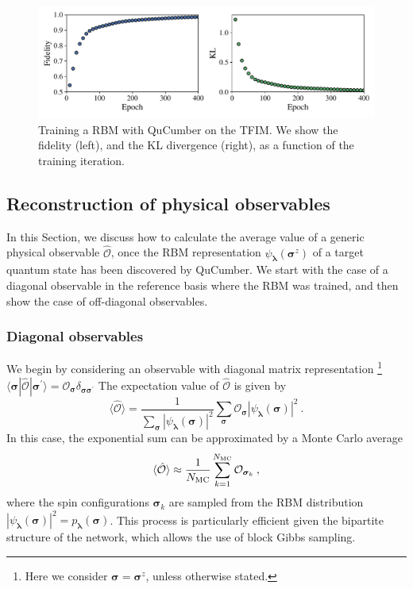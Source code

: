 \documentclass[submission, Phys, hidelinks]{SciPost}
\begin{document}
\begin{figure}[hbt]
    \centering{}
    \includegraphics[width=\textwidth]{plots/fid_KL.pdf}
    \caption{\label{fig:KL} Training a RBM with QuCumber on the TFIM. We show the fidelity (left), and the KL divergence (right), as a function of the training iteration.}
\end{figure}

\subsection{Reconstruction of physical observables} \label{Sec:Sampling_a-Trained_RBM}
In this Section, we discuss how to calculate the average value of a generic physical observable $\hat{\mathcal{O}}$, once the RBM representation $\psi_{\bm{\lambda}}(\bm{\sigma}^z)$ of a target quantum state has been discovered by QuCumber. We start with the case of a diagonal observable in the reference basis where the RBM was trained, and then show the case of off-diagonal observables.

\subsubsection{Diagonal observables}
We begin by considering an observable with diagonal matrix representation
\footnote{
Here we consider $\bm{\sigma}=\bm{\sigma}^z$, unless otherwise stated.
} 
$\langle\bm{\sigma}|\hat{\mathcal{O}}|\bm{\sigma}^{\prime}\rangle=\mathcal{O}_{\bm{\sigma}}\delta_{\bm{\sigma\sigma}^\prime}$
The expectation value of $\hat{\mathcal{O}}$ is given by
\begin{equation}
    \langle \hat{\mathcal{O}} \rangle = \frac{1}{\sum_{\bm{\sigma}} |\psi_{\bm{\lambda}}(\bm{\sigma})|^2}
    \sum_{\bm{\sigma}} \mathcal{O}_{\bm{\sigma}}|\psi_{\bm{\lambda}}(\bm{\sigma})|^2\:.
\end{equation}
In this case, the exponential sum can be approximated by a Monte Carlo average
\begin{equation}
    \langle \hat{\mathcal{O}}\rangle \approx \frac{1}{N_{\rm MC}} \sum_{k=1}^{N_{\rm MC}} \mathcal{O}_{\bm{\sigma}_k}\:,
\end{equation}
where the spin configurations $\bm{\sigma}_k$ are sampled from the RBM distribution $|\psi_{\bm{\lambda}}(\bm{\sigma})|^2=p_{\bm{\lambda}}(\bm{\sigma})$. This process is particularly efficient given the bipartite structure of the network, which allows the use of block Gibbs sampling. 
\end{document}
